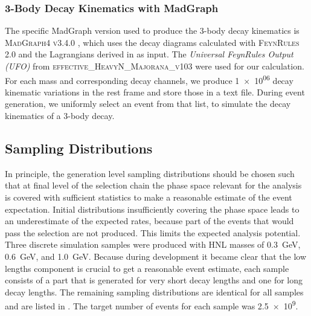 \subsubsection{3-Body Decay Kinematics with MadGraph} 

The specific MadGraph version used to produce the 3-body decay kinematics is \textsc{MadGraph4 v3.4.0} \cite{madgraph4}, which uses the decay diagrams calculated with \textsc{FeynRules 2.0}  and the Lagrangians derived in  as input. The \textit{Universal FeynRules Output (UFO)} from \textsc{effective\_HeavyN\_Majorana\_v103} were used for our calculation. For each mass and corresponding decay channels, we produce \SI{1e06}{} decay kinematic variations in the rest frame and store those in a text file. During event generation, we uniformly select an event from that list, to simulate the decay kinematics of a 3-body decay.


\subsection{Sampling Distributions} 

In principle, the generation level sampling distributions should be chosen such that at final level of the selection chain the phase space relevant for the analysis is covered with sufficient statistics to make a reasonable estimate of the event expectation. Initial distributions insufficiently covering the phase space leads to an underestimate of the expected rates, because part of the events that would pass the selection are not produced. This limits the expected analysis potential.
Three discrete simulation samples were produced with HNL masses of \SI{0.3}{\GeV}, \SI{0.6}{\GeV}, and \SI{1.0}{\GeV}. Because during development it became clear that the low lengths component is crucial to get a reasonable event estimate, each sample consists of a part that is generated for very short decay lengths and one for long decay lengths. The remaining sampling distributions are identical for all samples and are listed in . The target number of events for each sample was \SI{2.5e9}{}.

